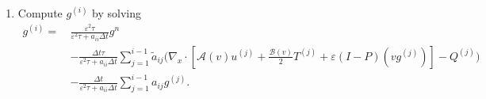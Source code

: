 \documentclass[final,11pt]{siamart251216}
\numberwithin{equation}{section}
\theoremstyle{definition}
\theoremstyle{remark}
\begin{document}
\begin{algorithm}\caption{An Asymptotic Preserving IMEX Runge-Kutta scheme for the low Mach limit} \label{IMEX}\scriptsize
\begin{enumerate}
\item Compute $g^{(i)}$ by solving
\begin{equation}
\label{FirstStep}
\begin{split}
g^{(i)} = \, &\frac{\varepsilon^2 \tau}{\varepsilon^2 \tau + a_{ii} \Delta t} g^n \\
&- \frac{\Delta t \tau}{\varepsilon^2 \tau + a_{ii} \Delta t} \sum_{j=1}^{i-1} \tilde{a}_{ij} \Biggl( \nabla_x \cdot \left[ \mathcal{A}(v) u^{(j)} + \frac{\mathcal{B}(v)}{2} T^{(j)} + \varepsilon (I-P)(vg^{(j)}) \right] - Q^{(j)} \Biggr) \\
&- \frac{\Delta t}{\varepsilon^2 \tau + a_{ii} \Delta t} \sum_{j=1}^{i-1} a_{ij} g^{(j)}.
\end{split}
\end{equation}


\end{enumerate}
\end{algorithm}
\end{document}
